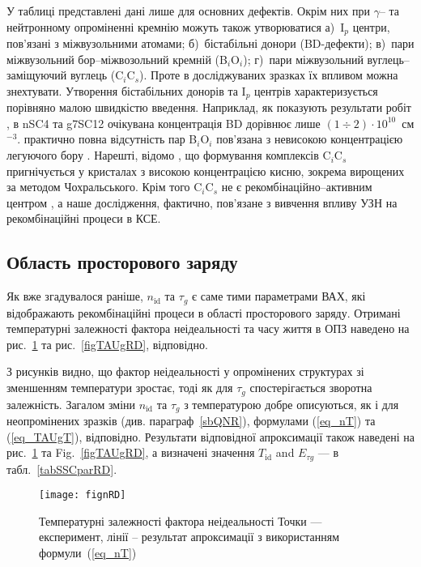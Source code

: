 У таблиці представлені дані лише для основних дефектів.
Окрім них при $\gamma$-- та нейтронному опроміненні кремнію можуть також утворюватися
а)~I$_p$ центри, пов'язані з міжвузольними атомами;
б)~бістабільні донори (BD-дефекти);
в)~пари міжвузольний бор--міжвозольний кремній (B$_i$O$_i$);
г)~пари міжвузольний вуглець--заміщуючий вуглець (C$_i$C$_s$).
Проте в досліджуваних зразках їх впливом можна знехтувати.
Утворення бістабільних донорів та I$_p$ центрів характеризується порівняно малою швидкістю введення.
Наприклад, як показують результати робіт \cite{n:gamma,BD:Fret}, в nSC4 та g7SC12 очікувана
концентрація BD дорівнює лише $(1\div2)\cdot10^{10}$~см$^{-3}$.
практично повна відсутність пар B$_i$O$_i$ пов'язана з невисокою концентрацією легуючого бору \cite{SiIntDef}.
Нарешті, відомо \cite{gamma:Kolkr,gamma:Stahl,n:long}, що формування комплексів C$_i$C$_s$ пригнічується у кристалах
з високою концентрацією кисню, зокрема вирощених за методом Чохральського.
Крім того  C$_i$C$_s$ не є рекомбінаційно--активним центром \cite{CiCs:Song}, а наше дослідження,
фактично, пов'язане з вивчення впливу УЗН на рекомбінаційні процеси в КСЕ.



\subsection{Область просторового заряду\label{sbSCR}}

Як вже згадувалося раніше, $n_{\mathrm{id}}$ та $\tau_{g}$ є саме тими параметрами ВАХ, які відображають рекомбінаційні процеси в
області просторового заряду.
Отримані температурні залежності фактора неідеальності та часу життя в ОПЗ наведено на рис.~\ref{fignRD} та рис.~\ref{figTAUgRD}, відповідно.



З рисунків видно, що фактор неідеальності у опромінених структурах зі зменшенням температури зростає,
тоді як для $\tau_{g}$ спостерігається зворотна залежність.
Загалом зміни $n_{\mathrm{id}}$ та $\tau_{g}$ з температурою добре описуються, як і для неопромінених зразків (див. параграф~\ref{sbQNR}),
 формулами (\ref{eq_nT}) та
(\ref{eq_TAUgT}), відповідно.
Результати відповідної апроксимації також наведені на рис.~\ref{fignRD} та Fig.~\ref{figTAUgRD},
а визначені значення $T_{\mathrm{id}}$ and $E_{\tau g}$ --- в табл.~\ref{tabSSCparRD}.

\begin{figure}
\center
\texttt{[image: fignRD]}%
\caption{\label{fignRD}
Температурні залежності фактора неідеальності
\FigCaptionSSCRD
Точки --- експеримент,
лінії -- результат апроксимації з використанням формули~(\ref{eq_nT})
}%
\end{figure}


